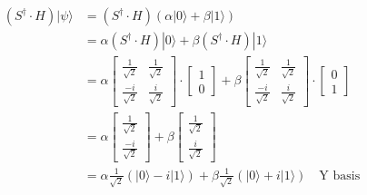 \documentclass{article}
\begin{document}
\begin{align*}
	(S^\dagger \cdot H) |\psi\rangle & = (S^\dagger \cdot H)(\alpha |0\rangle + \beta |1\rangle)                                                                  \\
	                                 & = \alpha (S^\dagger \cdot H)|0\rangle + \beta (S^\dagger \cdot H)|1\rangle                                                 \\
	                                 & = \alpha \begin{bmatrix}
		                                            \frac{1}{\sqrt{2}}  & \frac{1}{\sqrt{2}} \\
		                                            \frac{-i}{\sqrt{2}} & \frac{i}{\sqrt{2}}
	                                            \end{bmatrix}
	\cdot
	\begin{bmatrix}
		1 \\
		0
	\end{bmatrix}
	+ \beta \begin{bmatrix}
		        \frac{1}{\sqrt{2}}  & \frac{1}{\sqrt{2}} \\
		        \frac{-i}{\sqrt{2}} & \frac{i}{\sqrt{2}}
	        \end{bmatrix}
	\cdot
	\begin{bmatrix}
		0 \\
		1
	\end{bmatrix}                                                                                                                                                \\
	                                 & =
	\alpha \begin{bmatrix}
		       \frac{1}{\sqrt{2}} \\
		       \frac{-i}{\sqrt{2}}
	       \end{bmatrix}
	+
	\beta \begin{bmatrix}
		      \frac{1}{\sqrt{2}} \\
		      \frac{i}{\sqrt{2}}
	      \end{bmatrix}                                                                                                                       \\
	                                 & = \alpha \frac{1}{\sqrt{2}}(|0\rangle - i|1\rangle) + \beta \frac{1}{\sqrt{2}}(|0\rangle + i|1\rangle)\quad \text{Y basis}
\end{align*}
\end{document}
